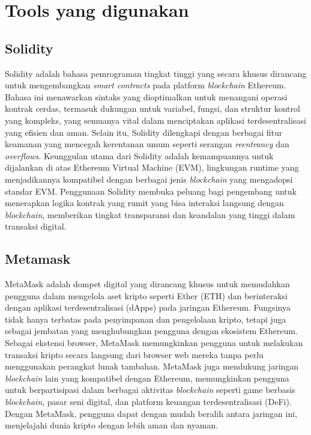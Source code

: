 \vspace{0.5 cm}

\section{Tools yang digunakan}
\label{sec:tools}
\subsection{Solidity}

Solidity adalah bahasa pemrograman tingkat tinggi yang secara khusus dirancang untuk mengembangkan \emph{smart contracts} pada platform \emph{blockchain} Ethereum. Bahasa ini menawarkan sintaks yang dioptimalkan untuk menangani operasi kontrak cerdas, termasuk dukungan untuk variabel, fungsi, dan struktur kontrol yang kompleks, yang semuanya vital dalam menciptakan aplikasi terdesentralisasi yang efisien dan aman. Selain itu, Solidity dilengkapi dengan berbagai fitur keamanan yang mencegah kerentanan umum seperti serangan \emph{reentrancy} dan \emph{overflows}. Keunggulan utama dari Solidity adalah kemampuannya untuk dijalankan di atas Ethereum Virtual Machine (EVM), lingkungan runtime yang menjadikannya kompatibel dengan berbagai jenis \emph{blockchain} yang mengadopsi standar EVM. Penggunaan Solidity membuka peluang bagi pengembang untuk menerapkan logika kontrak yang rumit yang bisa interaksi langsung dengan \emph{blockchain}, memberikan tingkat transparansi dan keandalan yang tinggi dalam transaksi digital.

\subsection{Metamask}

MetaMask adalah dompet digital yang dirancang khusus untuk memudahkan pengguna dalam mengelola aset kripto seperti Ether (ETH) dan berinteraksi dengan aplikasi terdesentralisasi (dApps) pada jaringan Ethereum. Fungsinya tidak hanya terbatas pada penyimpanan dan pengelolaan kripto, tetapi juga sebagai jembatan yang menghubungkan pengguna dengan ekosistem Ethereum. Sebagai ekstensi browser, MetaMask memungkinkan pengguna untuk melakukan transaksi kripto secara langsung dari browser web mereka tanpa perlu menggunakan perangkat lunak tambahan. MetaMask juga mendukung jaringan \emph{blockchain} lain yang kompatibel dengan Ethereum, memungkinkan pengguna untuk berpartisipasi dalam berbagai aktivitas \emph{blockchain} seperti game berbasis \emph{blockchain}, pasar seni digital, dan platform keuangan terdesentralisasi (DeFi). Dengan MetaMask, pengguna dapat dengan mudah beralih antara jaringan ini, menjelajahi dunia kripto dengan lebih aman dan nyaman.

